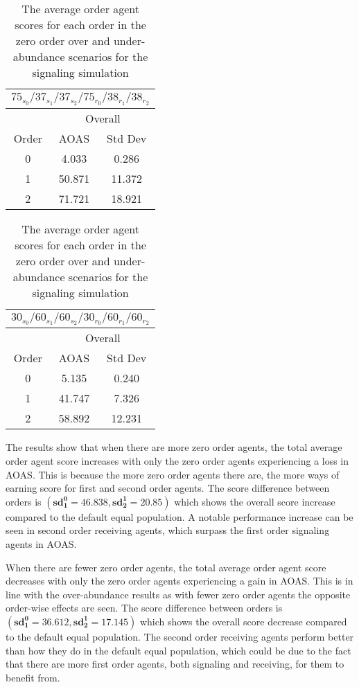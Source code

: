 \begin{table}[h]
    \centering
    \begin{tabular}{|c|c|c|}
    \hline
    \multicolumn{3}{|c|}{$75_{s_{0}}/37_{s_{1}}/37_{s_{2}}/75_{r_{0}}/38_{r_{1}}/38_{r_{2}}$} \\
    \hline
    \multicolumn{1}{|c|}{} & \multicolumn{2}{|c|}{Overall} \\
    \hline
    Order & AOAS & Std Dev \\
    \hline
    0     & 4.033   & 0.286    \\
    1     & 50.871  & 11.372   \\
    2     & 71.721  & 18.921   \\
    \hline
\end{tabular}
\qquad
\begin{tabular}{|c|c|c|}
    \hline
    \multicolumn{3}{|c|}{$30_{s_{0}}/60_{s_{1}}/60_{s_{2}}/30_{r_{0}}/60_{r_{1}}/60_{r_{2}}$} \\
    \hline
    \multicolumn{1}{|c|}{} & \multicolumn{2}{|c|}{Overall} \\
    \hline
    Order & AOAS & Std Dev \\
    \hline
    0     & 5.135   & 0.240    \\
    1     & 41.747  & 7.326   \\
    2     & 58.892  & 12.231   \\
    \hline
\end{tabular}
\caption{The average order agent scores for each order in the zero order over and under-abundance scenarios for the signaling simulation}
\label{table:sig-zero-order-overall}
\end{table}

The results show that when there are more zero order agents, the total average order agent score increases with only the zero order agents experiencing a loss in AOAS. This is because the more zero order agents there are, the more ways of earning score for first and second order agents. The score difference between orders is $(\mathbf{sd^0_1 = 46.838}, \mathbf{sd^1_2 = 20.85})$ which shows the overall score increase compared to the default equal population. A notable performance increase can be seen in second order receiving agents, which surpass the first order signaling agents in AOAS. 

When there are fewer zero order agents, the total average order agent score decreases with only the zero order agents experiencing a gain in AOAS. This is in line with the over-abundance results as with fewer zero order agents the opposite order-wise effects are seen. The score difference between orders is $(\mathbf{sd^0_1 = 36.612}, \mathbf{sd^1_2 = 17.145})$ which shows the overall score decrease compared to the default equal population. The second order receiving agents perform better than how they do in the default equal population, which could be due to the fact that there are more first order agents, both signaling and receiving, for them to benefit from.

